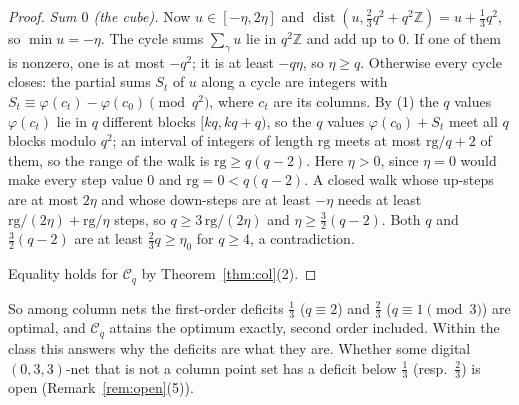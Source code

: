 \documentclass[11pt]{amsart}
\theoremstyle{definition}
\theoremstyle{plain}
\newcommand{\Z}{\mathbb{Z}}
\begin{document}
\begin{proof}
\emph{Sum $0$ (the cube).} Now $u\in[-\eta,2\eta]$ and $\operatorname{dist}(u,\frac23q^2+q^2\Z)=u+\frac13q^2$, so $\min u=-\eta$. The cycle sums $\sum_\gamma u$ lie in $q^2\Z$ and add up to $0$. If one of them is nonzero, one is at most $-q^2$; it is at least $-q\eta$, so $\eta\ge q$. Otherwise every cycle closes: the partial sums $S_t$ of $u$ along a cycle are integers with $S_t\equiv\varphi(c_t)-\varphi(c_0)\pmod{q^2}$, where $c_t$ are its columns. By (1) the $q$ values $\varphi(c_t)$ lie in $q$ different blocks $[kq,kq+q)$, so the $q$ values $\varphi(c_0)+S_t$ meet all $q$ blocks modulo $q^2$; an interval of integers of length $\mathrm{rg}$ meets at most $\mathrm{rg}/q+2$ of them, so the range of the walk is $\mathrm{rg}\ge q(q-2)$. Here $\eta>0$, since $\eta=0$ would make every step value $0$ and $\mathrm{rg}=0<q(q-2)$. A closed walk whose up-steps are at most $2\eta$ and whose down-steps are at least $-\eta$ needs at least $\mathrm{rg}/(2\eta)+\mathrm{rg}/\eta$ steps, so $q\ge3\,\mathrm{rg}/(2\eta)$ and $\eta\ge\frac32(q-2)$. Both $q$ and $\frac32(q-2)$ are at least $\frac23q\ge\eta_0$ for $q\ge4$, a contradiction.

Equality holds for $\mathcal C_q$ by Theorem~\ref{thm:col}(2).
\end{proof}

So among column nets the first-order deficits $\frac13$ ($q\equiv2$) and $\frac23$ ($q\equiv1\pmod3$) are optimal, and $\mathcal C_q$ attains the optimum exactly, second order included. Within the class this answers why the deficits are what they are. Whether some digital $(0,3,3)$-net that is not a column point set has a deficit below $\frac13$ (resp.\ $\frac23$) is open (Remark~\ref{rem:open}(5)).
\end{document}
